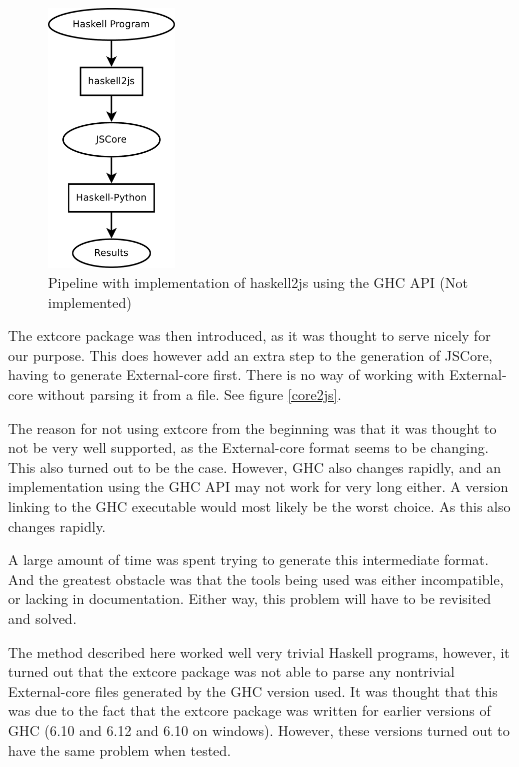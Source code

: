 \begin{figure}[H]
\begin{center}
\includegraphics[width=0.3\textwidth]{diags/pipe_w_haskell2js}
\caption[Pipeline without haskell2js]{Pipeline with implementation of haskell2js using the GHC API (Not implemented)}
\label{haskell2js}
\end{center}
\end{figure}

The extcore package was then introduced, as it was thought to serve nicely for our purpose. This
does however add an extra step to the generation of JSCore, having to generate External-core
first. There is no way of working with External-core without parsing it from a file. See figure \ref{core2js}.

The reason for not using extcore from the beginning was that it was thought to not be very 
well supported, as the External-core format seems to be changing. This also turned out to be
the case. However, GHC also changes rapidly, and an implementation using the GHC API may not
work for very long either. A version linking to the GHC executable would most likely be the
worst choice. As this also changes rapidly.

A large amount of time was spent trying to generate this intermediate format. And the
greatest obstacle was that the tools being used was either incompatible, or lacking in
documentation. Either way, this problem will have to be revisited and solved.

The method described here worked well very trivial Haskell programs, however, 
it turned out that
the extcore package was not able to parse any nontrivial External-core files generated 
by the GHC version used. It was thought that this was due to the fact that the extcore
package was written for earlier versions of GHC (6.10 and 6.12 and 6.10 on windows). However, 
these versions turned out to have the same problem when tested.

